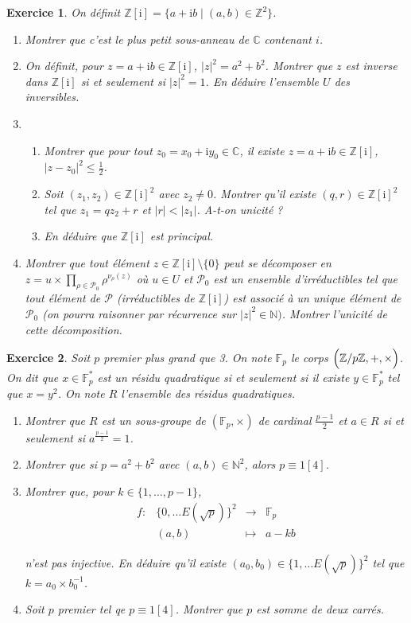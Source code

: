 \documentclass[12pt]{article}
\newtheorem{exercise}{Exercice}[section]
\theoremstyle{remark}
\theoremstyle{remark}
\newcommand{\C}{\mathbb{C}}
\newcommand{\N}{\mathbb{N}}
\newcommand{\Z}{\mathbb{Z}}
\newcommand{\function}[5]{
	$$
	\begin{array}{rccl}
		#1: & #2 & \to & #3 \\
		& #4 & \mapsto & #5
	\end{array}
	$$
}
\begin{document}
\begin{exercise}
	On définit $\Z[\mathrm{i}]=\{a+\mathrm{i}b\mid(a,b)\in\Z^{2}\}$.
	\begin{enumerate}
		\item Montrer que c'est le plus petit sous-anneau de $\C$ contenant $i$.
		\item On définit, pour $z=a+\mathrm{i}b\in\Z[\mathrm{i}]$, $\vert
		z\vert^{2}=a^{2}+b^{2}$. Montrer que $z$ est inverse dans
		$\Z[\mathrm{i}]$ si et seulement si $\vert z\vert^{2}=1$. En déduire
		l'ensemble $U$ des inversibles.
		\item 	\begin{enumerate}
					\item Montrer que pour tout $z_{0}=x_{0}+\mathrm{i}y_{0}\in\C$,
					il existe $z=a+\mathrm{i}b\in\Z[\mathrm{i}]$, $\vert
					z-z_{0}\vert^{2}\leqslant\frac{1}{2}$.
					\item Soit $(z_{1},z_{2})\in\Z[\mathrm{i}]^{2}$ avec
					$z_{2}\neq 0$. Montrer qu'il existe
					$(q,r)\in\Z[\mathrm{i}]^{2}$ tel que $z_{1}=qz_{2}+r$ et
					$\vert r\vert<\vert z_{1}\vert$. A-t-on unicité ?
					\item En déduire que $\Z[\mathrm{i}]$ est principal.
				\end{enumerate}
		\item Montrer que tout élément $z\in\Z[\mathrm{i}]\setminus\{0\}$ peut
		se décomposer en
		$z=u\times\prod_{\rho\in\mathcal{P}_{0}}\rho^{\nu_{\rho}(z)}$ où $u\in
		U$ et $\mathcal{P}_{0}$ est un ensemble d'irréductibles tel que tout
		élément de $\mathcal{P}$ (irréductibles de $\Z[\mathrm{i}]$) est associé
		à un unique élément de $\mathcal{P}_{0}$ (on pourra raisonner par
		récurrence sur $\vert z\vert^{2}\in\N)$. Montrer l'unicité de cette décomposition.
	\end{enumerate}
\end{exercise}

\begin{exercise}
	Soit $p$ premier plus grand que 3. On note $\mathbb{F}_{p}$ le corps
	$\Bigl(\Z/p\Z,+,\times\Bigr)$. On dit que $x\in\mathbb{F}_{p}^{*}$ est un
	résidu quadratique si et seulement si il existe $y\in\mathbb{F}_{p}^{*}$ tel
	que $x=y^{2}$. On note $R$ l'ensemble des résidus quadratiques.
	\begin{enumerate}
		\item Montrer que $R$ est un sous-groupe de $(\mathbb{F}_{p},\times)$ de
		cardinal $\frac{p-1}{2}$ et $a\in R$ si et seulement si
		$a^{\frac{p-1}{2}}=1$.
		\item Montrer que si $p=a^{2}+b^{2}$ avec $(a,b)\in\N^{2}$, alors
		$p\equiv 1[4]$.
		\item Montrer que, pour $k\in\{1,\dots,p-1\}$, \function{f}{\{0,\dots E(\sqrt{p})\}^{2}}{\mathbb{F}_p}{(a,b)}{a-kb}
		n'est pas injective. En déduire qu'il existe $(a_{0},b_{0})\in\{1,\dots
		E(\sqrt{p})\}^{2}$ tel que $k=a_{0}\times b_{0}^{-1}$.
		\item Soit $p$ premier tel qe $p\equiv 1[4]$. Montrer que $p$ est somme
		de deux carrés.
	\end{enumerate}
\end{exercise}
\end{document}
